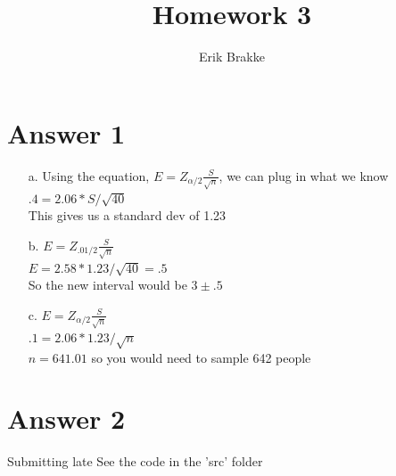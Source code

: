 \documentclass[11pt]{article}
\theoremstyle{definition}
\begin{document}
\title{Homework 3}
\author{Erik Brakke}
\maketitle

\thispagestyle{fancy}
 
 
\section*{Answer 1}
\begin{enumerate}
	\item[a.] Using the equation, $E = Z_{\alpha/2}\frac{S}{\sqrt{n}}$, we can plug in what we know\\
	$.4 = 2.06*S / \sqrt{40}$\\
	This gives us a standard dev of 1.23
	
	\item[b.] $E = Z_{.01/2}\frac{S}{\sqrt{n}}$\\
	$E = 2.58 * 1.23 / \sqrt{40} = .5$\\
	So the new interval would be $3 \pm .5$\\
	
	\item[c.] $E = Z_{\alpha/2}\frac{S}{\sqrt{n}}$\\
	$.1 = 2.06*1.23 / \sqrt{n}$\\
	$n = 641.01$ so you would need to sample 642 people
\end{enumerate}

\section*{Answer 2}
Submitting late
See the code in the 'src' folder
\end{document}
